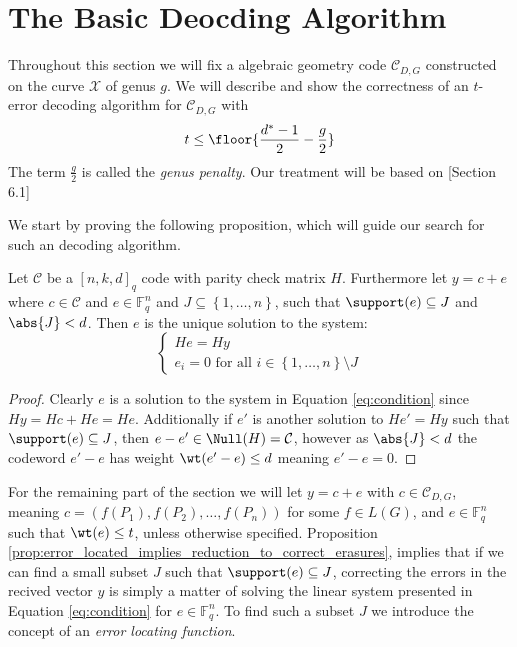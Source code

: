 \section{The Basic Deocding Algorithm}%
Throughout this section we will fix a algebraic geometry code $\mathcal{C}_{D, G}$ constructed on the curve $\mathcal{X}$ of genus $g$. We will describe and show the correctness of an $t$-error decoding algorithm for $\mathcal{C}_{D, G}$ with
\begin{equation*}
  t \leq \floor{\frac{d^{*} - 1}{2} - \frac{g}{2}}
\end{equation*}
The term $\frac{g}{2}$ is called the \textit{genus penalty}. Our treatment will be based on \cite{AG_codes_and_applications}[Section 6.1]

We start by proving the following proposition, which will guide our search for such an decoding algorithm.
\begin{proposition}\label{prop:error_located_implies_reduction_to_correct_erasures}
  Let $\mathcal{C}$ be a $[n, k, d]_q$ code with parity check matrix $H$. Furthermore let $y = c + e$ where $c \in \mathcal{C}$ and $e \in \mathbb{F}_q^n$ and $J \subseteq \left\{1, \ldots, n\right\}$, such that $\support(e) \subseteq J$ and $\abs{J} < d$. Then $e$ is the unique solution to the system:
\begin{equation}\label{eq:condition}
  \begin{cases} He = Hy \\ e_i = 0 \text{ for all } i \in \left\{1, \ldots, n\right\} \setminus J\end{cases}
\end{equation}
\end{proposition}
\begin{proof}
Clearly $e$ is a solution to the system in Equation \eqref{eq:condition} since $Hy = Hc + He = He$. Additionally if $e'$ is another solution to $He' = Hy$ such that $\support(e) \subseteq J$, then $e - e' \in \Null(H) = \mathcal{C}$, however as $\abs{J} < d$ the codeword $e' - e$ has weight $\wt(e' - e) \leq d$ meaning $e' - e = 0$.
\end{proof}

For the remaining part of the section we will let $y = c + e$ with $c  \in \mathcal{C}_{D, G}$, meaning $c = (f(P_{1}), f(P_{2}), \ldots, f(P_{n}))$ for some $f \in L(G)$, and $e \in \mathbb{F}_q^{n}$ such that $\wt(e) \leq t$, unless otherwise specified. Proposition \ref{prop:error_located_implies_reduction_to_correct_erasures}, implies that if we can find a small subset $J$ such that $\support(e) \subseteq J$, correcting the errors in the recived vector $y$ is simply a matter of solving the linear system presented in Equation \eqref{eq:condition} for $e \in \mathbb{F}_q^n$. To find such a subset $J$ we introduce the concept of an \textit{error locating function}.


